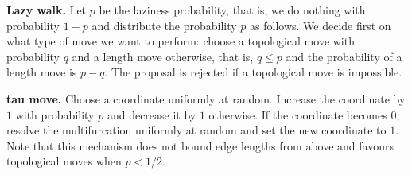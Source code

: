 \documentclass{amsart}
\begin{document}
{\bf Lazy walk.} Let $p$ be the laziness probability, that is, we do nothing 
with probability $1-p$ and distribute the probability $p$ as follows. 
We decide first on what type of move we want to perform: choose a topological 
move with probability $q$ and a length move otherwise, that is, $q \leq p$
and the probability of a length move is $p-q$. The proposal is rejected if
a topological move is impossible. 

{\bf tau move.} Choose a coordinate uniformly at random. Increase the
coordinate by $1$ with probability $p$ and decrease it by $1$ otherwise.
If the coordinate becomes $0$, resolve the multifurcation uniformly at
random and set the new coordinate to $1$. Note that this mechanism 
does not bound edge lengths from above and favours topological moves when 
$p<1/2$. 



\end{document}
